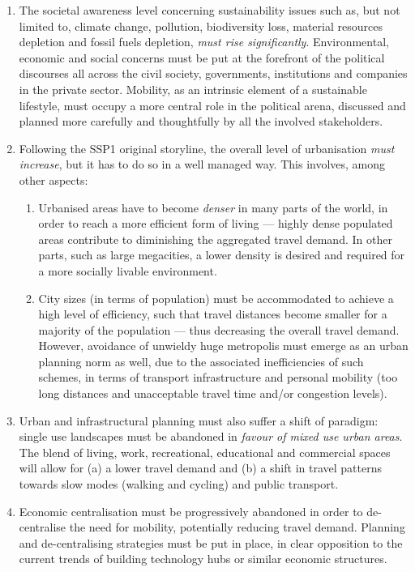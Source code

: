 \begin{enumerate}
\item {}The societal awareness level concerning sustainability issues such as, but not limited to, climate change, pollution, biodiversity loss, material resources depletion and fossil fuels depletion, \emph{must rise significantly}. Environmental, economic and social concerns must be put at the forefront of the political discourses all across the civil society, governments, institutions and companies in the private sector. Mobility, as an intrinsic element of a sustainable lifestyle, must occupy a more central role in the political arena, discussed and planned more carefully and thoughtfully by all the involved stakeholders.
\item Following the SSP1 original storyline, the overall level of urbanisation \emph{must increase}, but it has to do so in a well managed way. This involves, among other aspects:
	\begin{enumerate}
	\item Urbanised areas have to become \emph{denser} in many parts of the world, in order to reach a more efficient form of living --- highly dense populated areas contribute to diminishing the aggregated travel demand. In other parts, such as large megacities, a lower density is desired and required for a more socially livable environment.
	\item City sizes (in terms of population) must be accommodated to achieve a high level of efficiency, such that travel distances become smaller for a majority of the population --- thus decreasing the overall travel demand. However, avoidance of unwieldy huge metropolis must emerge as an urban planning norm as well, due to the associated inefficiencies of such schemes, in terms of transport infrastructure and personal mobility (too long distances and unacceptable travel time and/or congestion levels).
	\end{enumerate}
\item Urban and infrastructural planning must also suffer a shift of paradigm: single use landscapes must be abandoned in \emph{favour of mixed use urban areas}. The blend of living, work, recreational, educational and commercial spaces will allow for (a) a lower travel demand and (b) a shift in travel patterns towards slow modes (walking and cycling) and public transport.
\item Economic centralisation must be progressively abandoned in order to de-centralise the need for mobility, potentially reducing travel demand. Planning and de-centralising strategies must be put in place, in clear opposition to the current trends of building technology hubs or similar economic structures.

\end{enumerate}
